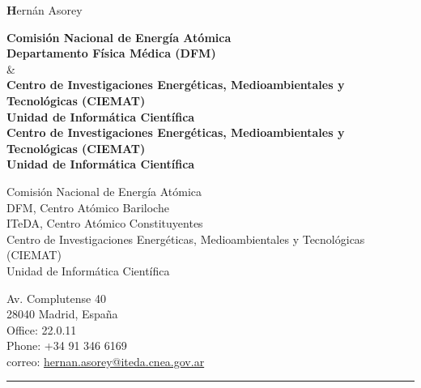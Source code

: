 \documentclass[11pt, a4paper]{article}
\begin{document}
  \begin{center}{\huge \textbf Hernán Asorey}\\[1cm]\end{center}
  \begin{center}
	{\textbf{Comisión Nacional de Energía Atómica}}\\
	{\textbf{Departamento Física Médica (DFM)}}\\
	\& \\
	{\textbf{Centro de Investigaciones Energéticas, Medioambientales y Tecnológicas (CIEMAT)}}\\
	{\textbf{Unidad de Informática Científica}}\\
	{\textbf{Centro de Investigaciones Energéticas, Medioambientales y Tecnológicas (CIEMAT)}}\\
	{\textbf{Unidad de Informática Científica}}\\

  \end{center}
  \begin{minipage}[t]{0.55\textwidth}
	Comisión Nacional de Energía Atómica\\
	\hspace*{1em}DFM, Centro Atómico Bariloche\\
	\hspace*{1em}ITeDA, Centro Atómico Constituyentes\\
 	Centro de Investigaciones Energéticas, Medioambientales y Tecnológicas (CIEMAT)\\
	\hspace*{1em}Unidad de Informática Científica\\
  \end{minipage}\hspace*{0.02\textwidth}
  \begin{minipage}[t]{0.45\textwidth}
	Av. Complutense 40\\
	28040 Madrid, España\\
	Office: 22.0.11\\
	Phone: +34 91 346 6169\\
	correo: \href{mailto:hernan.asorey@iteda.cnea.gov.ar}{hernan.asorey@iteda.cnea.gov.ar}\\
  \end{minipage}
\hrule
\end{document}
